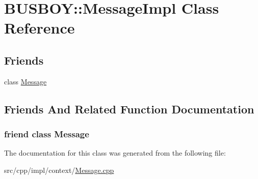 \hypertarget{classBUSBOY_1_1MessageImpl}{
\section{BUSBOY::MessageImpl Class Reference}
\label{classBUSBOY_1_1MessageImpl}
}
\subsection*{Friends}
\begin{DoxyCompactItemize}
\item 
class \hyperlink{classBUSBOY_1_1MessageImpl_a658ef47bd757fd5e0f13adab5a417ced}{Message}
\end{DoxyCompactItemize}


\subsection{Friends And Related Function Documentation}
\hypertarget{classBUSBOY_1_1MessageImpl_a658ef47bd757fd5e0f13adab5a417ced}{
\subsubsection[{Message}]{\setlength{\rightskip}{0pt plus 5cm}friend class {\bf Message}}}
\label{classBUSBOY_1_1MessageImpl_a658ef47bd757fd5e0f13adab5a417ced}


The documentation for this class was generated from the following file:\begin{DoxyCompactItemize}
\item 
src/cpp/impl/context/\hyperlink{Message_8cpp}{Message.cpp}\end{DoxyCompactItemize}
